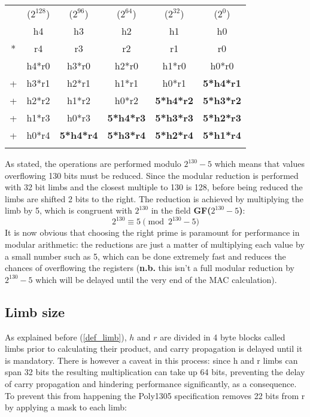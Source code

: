 \documentclass{article}
\begin{document}
\begin{tabular}{cccccc}
\\
    & ($2^{128}$)   & ($2^{96}$)    & ($2^{64}$)    & ($2^{32}$)    & ($2^{0}$)     \\
    & h4            & h3            & h2            & h1            & h0            \\
*   & r4            & r3            & r2            & r1            & r0            \\
\hline
    & h4*r0 & h3*r0 & h2*r0 & h1*r0 & h0*r0 \\
+   & h3*r1 & h2*r1 & h1*r1 & h0*r1 & \textbf{5*h4*r1} \\
+   & h2*r2 & h1*r2 & h0*r2 & \textbf{5*h4*r2} & \textbf{5*h3*r2} \\
+   & h1*r3 & h0*r3 & \textbf{5*h4*r3} & \textbf{5*h3*r3} & \textbf{5*h2*r3} \\
+   & h0*r4 & \textbf{5*h4*r4} & \textbf{5*h3*r4} & \textbf{5*h2*r4} & \textbf{5*h1*r4}\\
\\
\end{tabular}

As stated, the operations are performed modulo $2^{130}-5$ which means that values overflowing 130 bits must be reduced. Since the modular reduction 
is performed with 32 bit limbs and the closest multiple to 130 is 128, before being reduced the limbs are shifted 2 bits to the right. The reduction is achieved
by multiplying the limb by 5, which is congruent with $2^{130}$ in the field \textbf{GF($2^{130}-5$)}:
$$2^{130} \equiv 5 \pmod{2^{130}-5}$$ 
It is now obvious that choosing the right prime is paramount for performance in modular arithmetic: the reductions are just a matter of multiplying each value 
by a small number such as 5, which can be done extremely fast and reduces the chances of overflowing the registers (\textbf{n.b.} this isn't a full modular 
reduction by $2^{130}-5$ which will be delayed until the very end of the MAC calculation).

\subsection{Limb size}
As explained before (\ref{def_limb}), $h$ and $r$ are divided in 4 byte blocks called limbs prior to calculating their product, and carry propagation is delayed
until it is mandatory. There is however a caveat in this process: since h and r limbs can span 32 bits  the resulting multiplication can take up 64 bits, 
preventing the delay of carry propagation and hindering performance significantly, as a consequence. To prevent this from happening the Poly1305 specification 
removes 22 bits from r by applying a mask to each limb:
\end{document}
